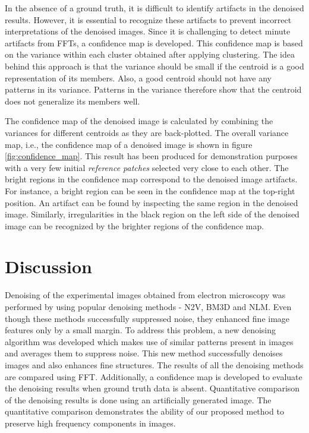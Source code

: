 \documentclass[fleqn,10pt]{wlscirep}
\begin{document}
	In the absence of a ground truth, it is difficult to identify artifacts in the denoised results. However, it is essential to recognize these artifacts to prevent incorrect interpretations of the denoised images. Since it is challenging to detect minute artifacts from FFTs, a confidence map is developed. This confidence map is based on the variance within each cluster obtained after applying clustering. The idea behind this approach is that the variance should be small if the centroid is a good representation of its members. Also, a good centroid should not have any patterns in its variance. Patterns in the variance therefore show that the centroid does not generalize its members well. 
	
	The confidence map of the denoised image is calculated by combining the variances\cite{chan1982updating} for different centroids as they are back-plotted. The overall variance map, i.e., the confidence map of a denoised image is shown in figure \ref{fig:confidence_map}. This result has been produced for demonstration purposes with a very few initial \textit{reference patches} selected very close to each other. The bright regions in the confidence map correspond to the denoised image artifacts. For instance, a bright region can be seen in the confidence map at the top-right position. An artifact can be found by inspecting the same region in the denoised image. Similarly, irregularities in the black region on the left side of the denoised image can be recognized by the brighter regions of the confidence map.
	

	
	\section*{Discussion}
	
	Denoising of the experimental images obtained from electron microscopy was performed by using popular denoising methods - N2V, BM3D and NLM. Even though these methods successfully suppressed noise, they enhanced fine image features only by a small margin. To address this problem, a new denoising algorithm was developed which makes use of similar patterns present in images and averages them to suppress noise. This new method successfully denoises images and also enhances fine structures. The results of all the denoising methods are compared using FFT. Additionally, a confidence map is developed to evaluate the denoising results when ground truth data is absent. Quantitative comparison of the denoising results is done using an artificially generated image. The quantitative comparison demonstrates the ability of our proposed method to preserve high frequency components in images.  
	
\end{document}
